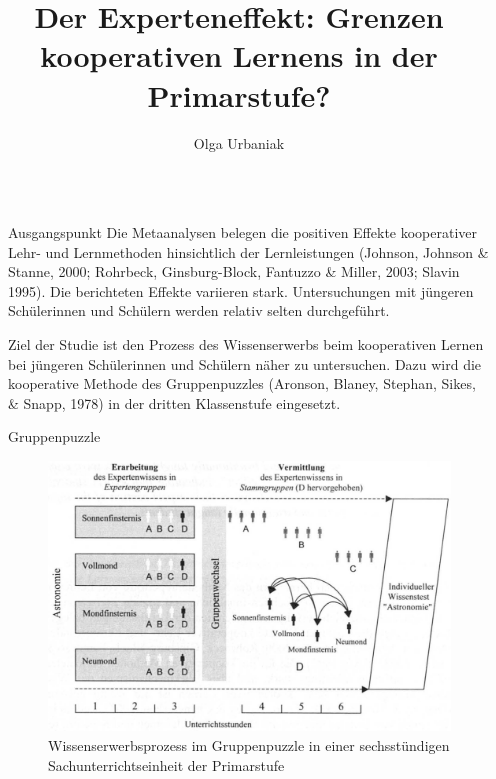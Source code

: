 \documentclass[final]{beamer}
\title{Der Experteneffekt: Grenzen kooperativen Lernens in der Primarstufe?} %
\author{Olga Urbaniak} %
\institute{FU Berlin} %
\newlength{\sepwid}
\newlength{\onecolwid}
\begin{document}
\setlength{\belowcaptionskip}{2ex} %
\setlength\belowdisplayshortskip{2ex} %
\begin{frame}[t] %
\begin{columns}[t] %


\begin{column}{\sepwid}\end{column} %
\begin{column}{\onecolwid} %

\begin{block}{Ausgangspunkt}
Die Metaanalysen belegen die positiven Effekte kooperativer Lehr- und Lernmethoden hinsichtlich der Lernleistungen (Johnson, Johnson \& Stanne, 2000; Rohrbeck, Ginsburg-Block, Fantuzzo \& Miller, 2003; Slavin 1995). Die berichteten Effekte variieren stark. Untersuchungen mit jüngeren Schülerinnen und Schülern werden relativ selten durchgeführt. 

Ziel der Studie ist den Prozess des Wissenserwerbs beim kooperativen Lernen bei jüngeren Schülerinnen und Schülern näher zu untersuchen. Dazu wird die kooperative Methode des Gruppenpuzzles (Aronson, Blaney, Stephan, Sikes, \& Snapp, 1978) in der dritten Klassenstufe eingesetzt.
\end{block}


\begin{block}{Gruppenpuzzle}

\begin{figure}
\includegraphics[width=0.67\linewidth]{experteneffekt.jpg}
\caption{Wissenserwerbsprozess im Gruppenpuzzle in einer sechsstündigen Sachunterrichtseinheit der Primarstufe}
\end{figure}


\end{block}
\end{column}
\end{columns}
\end{frame}
\end{document}
